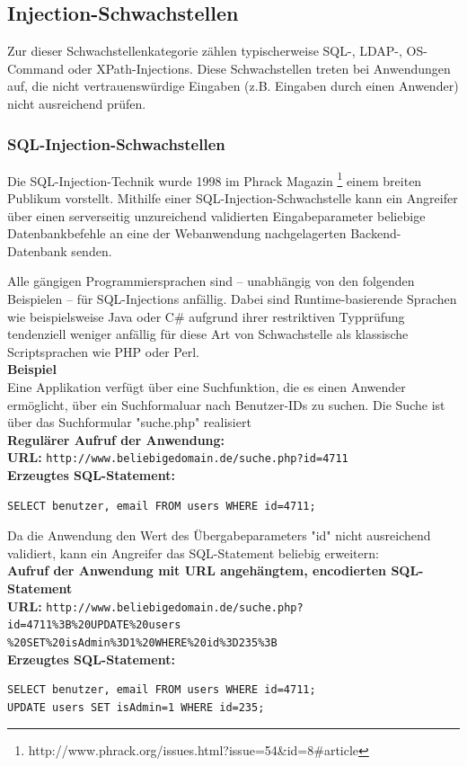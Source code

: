\subsection{Injection-Schwachstellen}

Zur dieser Schwachstellenkategorie zählen typischerweise SQL-, LDAP-, 
OS-Command oder XPath-Injections. Diese Schwachstellen treten bei 
Anwendungen auf, die nicht vertrauenswürdige Eingaben 
(z.B. Eingaben durch einen Anwender) nicht ausreichend prüfen.


\subsubsection{SQL-Injection-Schwachstellen}

Die SQL-Injection-Technik wurde 1998 im Phrack Magazin
\footnote{http://www.phrack.org/issues.html?issue=54\&id=8\#article} 
einem breiten Publikum vorstellt. Mithilfe einer SQL-Injection-Schwachstelle 
kann ein Angreifer über einen serverseitig unzureichend 
validierten Eingabeparameter beliebige Datenbankbefehle an eine der 
Webanwendung nachgelagerten Backend-Datenbank senden.

Alle gängigen Programmiersprachen sind – unabhängig von den folgenden 
Beispielen – für SQL-Injections anfällig. Dabei sind Runtime-basierende 
Sprachen wie beispielsweise Java oder C\# aufgrund ihrer  restriktiven 
Typprüfung tendenziell weniger anfällig für diese Art von Schwachstelle 
als klassische Scriptsprachen wie PHP oder Perl.
\\
\textbf{Beispiel}
\\
Eine Applikation verfügt über eine Suchfunktion, die es einen Anwender 
ermöglicht, über ein Suchformaluar nach Benutzer-IDs zu suchen. 
Die Suche ist über das Suchformular "suche.php" realisiert
\\
\textbf{Regulärer Aufruf der Anwendung:}
\\
\textbf{URL:} \texttt{http://www.beliebigedomain.de/suche.php?id=4711}
\\
\textbf{Erzeugtes SQL-Statement:}
\begin{lstlisting}[basicstyle=\ttfamily\footnotesize]
SELECT benutzer, email FROM users WHERE id=4711;
\end{lstlisting}
Da die Anwendung den Wert des Übergabeparameters "id" nicht ausreichend validiert, kann ein Angreifer das SQL-Statement beliebig erweitern:
\\
\textbf{Aufruf der Anwendung mit URL angehängtem, encodierten SQL-Statement}
\\
\textbf{URL:} \texttt{http://www.beliebigedomain.de/suche.php?id=4711\%3B\%20UPDATE\%20users\\\%20SET\%20isAdmin\%3D1\%20WHERE\%20id\%3D235\%3B}
\\
\textbf{Erzeugtes SQL-Statement:}
\begin{lstlisting}[basicstyle=\ttfamily\footnotesize]
SELECT benutzer, email FROM users WHERE id=4711; 
UPDATE users SET isAdmin=1 WHERE id=235;
\end{lstlisting}

